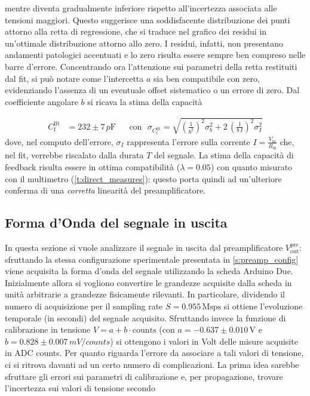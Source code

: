 \documentclass[a4paper,11pt]{article} %
\begin{document}
mentre diventa gradualmente inferiore rispetto all'incertezza associata alle tensioni maggiori. Questo suggerisce una
soddisfacente distribuzione dei punti attorno alla retta di regressione, che si traduce nel grafico dei residui in
un'ottimale distribuzione attorno allo zero. I residui, infatti, non presentano andamenti patologici accentuati e lo
zero risulta essere sempre ben compreso nelle barre d'errore. Concentrando ora l'attenzione sui parametri della retta
restituiti dal fit, si può notare come l'intercetta $a$ sia ben compatibile con zero, evidenziando l'assenza di un
eventuale offset sistematico o un errore di zero. Dal coefficiente angolare $b$ si ricava la stima della capacità

\begin{align}\label{e:preamp_cf}
	C_{\text{f}}^{\text{fit}}& = 232 \pm 7 \,\si{p\farad} 
	& 
	&\text{con} \,\,\,\, \sigma_{ C_{\text{f}}^{\text{fit}} } = 
	\sqrt
	{ 
		\left(
			\frac{1}{b^2}
		\right)^2
		\sigma_b^2 +
		2 \, \left(
			\frac{1}{b\,I}
		\right)^2
		\sigma_I^2
	}
\end{align}
dove, nel computo dell'errore, $\sigma_I$ rappresenta l'errore sulla corrente $I =
\frac{V_{\text{in}}}{R_{\text{in}}}$ che, nel fit, verrebbe riscalato dalla durata $T$ del segnale. La stima della
capacità di feedback risulta essere in ottima compatibilità ($\lambda = 0.05$) con quanto misurato con il multimetro
(\autoref{t:direct_measures}): questo porta quindi ad un'ulteriore conferma di una \textit{corretta} linearità del
preamplificatore.


\subsection{Forma d'Onda del segnale in uscita}\label{s:preamp_waveform}

In questa sezione si vuole analizzare il segnale in uscita dal preamplificatore $V^{\text{pre}}_{\text{out}}$:
sfruttando la stessa configurazione sperimentale presentata in \autoref{s:preamp_config} viene acquisita la forma d'onda
del segnale utilizzando la scheda Arduino Due. Inizialmente allora si vogliono convertire le grandezze acquisite dalla
scheda in unità arbitrarie a grandezze fisicamente rilevanti. In particolare, dividendo il numero di acquisizione per il
sampling rate $S=0.955\,\text{Msps}$ si ottiene l'evoluzione temporale (in secondi) del segnale acquisito. Sfruttando
invece la funzione di calibrazione in tensione $V= a  +  b \cdot \text{counts}$ (con $a=-0.637 \pm 0.010\,\si{\volt}$ e
$b=0.828\pm0.007\,\si{mV/counts}$) si ottengono i valori in Volt delle misure acquisite in ADC counts. Per quanto
riguarda l'errore da associare a tali valori di tensione, ci si ritrova davanti ad un certo numero di complicazioni. La
prima idea sarebbe sfruttare gli errori sui parametri di calibrazione e, per propagazione, trovare l'incertezza sui
valori di tensione secondo 
\end{document}
